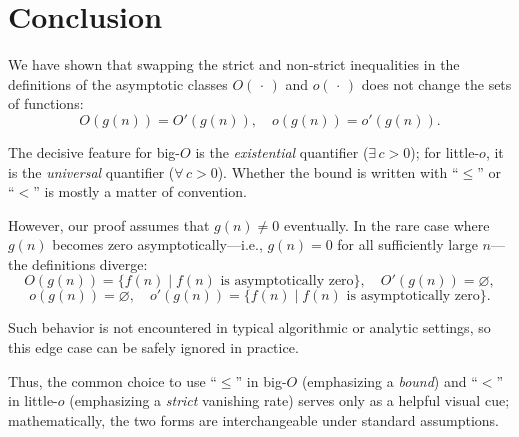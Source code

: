 \documentclass[12pt]{article}
\begin{document}
\section*{Conclusion}

We have shown that swapping the strict and non-strict inequalities in the definitions of the asymptotic classes \(O(\,{\cdot}\,)\) and \(o(\,{\cdot}\,)\) does not change the sets of functions:
\[
   O(g(n)) = O'(g(n)), \quad  o(g(n)) = o'(g(n)).
\]

The decisive feature for big-\(O\) is the \emph{existential} quantifier (\(\exists\,c>0\)); for little-\(o\), it is the \emph{universal} quantifier (\(\forall\,c>0\)). Whether the bound is written with ``\(\leq\)'' or ``\(<\)'' is mostly a matter of convention.

However, our proof assumes that \(g(n) \neq 0\) eventually. In the rare case where \(g(n)\) becomes zero asymptotically—i.e., \(g(n) = 0\) for all sufficiently large \(n\)—the definitions diverge:
\[
    O(g(n)) = \{ f(n) \mid f(n) \text{ is asymptotically zero} \}, \quad O'(g(n)) = \varnothing,
\]
\[
    o(g(n)) = \varnothing, \quad o'(g(n)) = \{ f(n) \mid f(n) \text{ is asymptotically zero} \}.
\]

Such behavior is not encountered in typical algorithmic or analytic settings, so this edge case can be safely ignored in practice.

Thus, the common choice to use ``\(\leq\)'' in big-\(O\) (emphasizing a \textit{bound}) and ``\(<\)'' in little-\(o\) (emphasizing a \textit{strict} vanishing rate) serves only as a helpful visual cue; mathematically, the two forms are interchangeable under standard assumptions.
\end{document}

